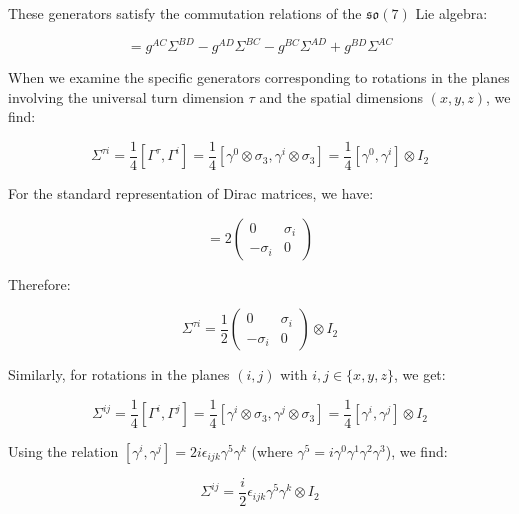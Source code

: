 \documentclass{article}
\begin{document}
These generators satisfy the commutation relations of the $\mathfrak{so}(7)$ Lie algebra:

\begin{equation}
[\Sigma^{AB}, \Sigma^{CD}] = g^{AC}\Sigma^{BD} - g^{AD}\Sigma^{BC} - g^{BC}\Sigma^{AD} + g^{BD}\Sigma^{AC}
\end{equation}

When we examine the specific generators corresponding to rotations in the planes involving the universal turn dimension $\tau$ and the spatial dimensions $(x,y,z)$, we find:

\begin{equation}
\Sigma^{\tau i} = \frac{1}{4}[\Gamma^\tau, \Gamma^i] = \frac{1}{4}[\gamma^0 \otimes \sigma_3, \gamma^i \otimes \sigma_3] = \frac{1}{4}[\gamma^0, \gamma^i] \otimes I_2
\end{equation}

For the standard representation of Dirac matrices, we have:

\begin{equation}
[\gamma^0, \gamma^i] = 2\begin{pmatrix} 0 & \sigma_i \\ -\sigma_i & 0 \end{pmatrix}
\end{equation}

Therefore:

\begin{equation}
\Sigma^{\tau i} = \frac{1}{2}\begin{pmatrix} 0 & \sigma_i \\ -\sigma_i & 0 \end{pmatrix} \otimes I_2
\end{equation}

Similarly, for rotations in the planes $(i,j)$ with $i,j \in \{x,y,z\}$, we get:

\begin{equation}
\Sigma^{ij} = \frac{1}{4}[\Gamma^i, \Gamma^j] = \frac{1}{4}[\gamma^i \otimes \sigma_3, \gamma^j \otimes \sigma_3] = \frac{1}{4}[\gamma^i, \gamma^j] \otimes I_2
\end{equation}

Using the relation $[\gamma^i, \gamma^j] = 2i\epsilon_{ijk}\gamma^5\gamma^k$ (where $\gamma^5 = i\gamma^0\gamma^1\gamma^2\gamma^3$), we find:

\begin{equation}
\Sigma^{ij} = \frac{i}{2}\epsilon_{ijk}\gamma^5\gamma^k \otimes I_2
\end{equation}
\end{document}
